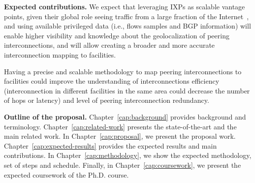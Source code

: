 	\textbf{Expected contributions.} We expect that leveraging IXPs as scalable vantage points, given their global role seeing traffic from a large fraction of the Internet~\cite{Chatzis:2013:BUL:2504730.2504746}, and using available privileged data (i.e., flows samples and BGP information) will enable higher visibility and knowledge about the geolocalization of peering interconnections, and will allow creating a broader and more accurate interconnection mapping to facilities. 

	Having a precise and scalable methodology to map peering interconnections to facilities could improve the understanding of interconnections efficiency (interconnection in different facilities in the same area could decrease the number of hops or latency) and level of peering interconnection redundancy.


	\textbf{Outline of the proposal.} Chapter~\ref{cap:background} provides background and terminology. Chapter~\ref{cap:related-work} presents the state-of-the-art and the main related work. In Chapter~\ref{cap:proposal}, we present the proposal work. Chapter~\ref{cap:expected-results} provides the expected results and main contributions. In Chapter~\ref{cap:methodology}, we show the expected methodology, set of steps and schedule. Finally, in Chapter~\ref{cap:coursework}, we present the expected coursework of the Ph.D. course.


